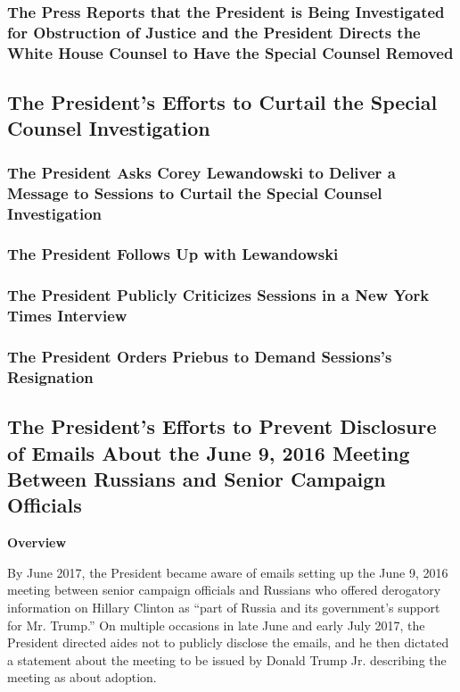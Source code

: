 \subsubsection{The Press Reports that the President is Being Investigated for Obstruction of Justice and the President Directs the White House Counsel to Have the Special Counsel Removed}

\subsection{The President’s Efforts to Curtail the Special Counsel Investigation}

\subsubsection{The President Asks Corey Lewandowski to Deliver a Message to Sessions to Curtail the Special Counsel Investigation}

\subsubsection{The President Follows Up with Lewandowski}

\subsubsection{The President Publicly Criticizes Sessions in a New York Times Interview}

\subsubsection{The President Orders Priebus to Demand Sessions’s Resignation}

\subsection{The President’s Efforts to Prevent Disclosure of Emails About the June 9, 2016 Meeting Between Russians and Senior Campaign Officials}

\begin{center}
\textbf{Overview}
\end{center}

By June 2017, the President became aware of emails setting up the June 9, 2016 meeting between senior campaign officials and Russians who offered derogatory information on Hillary Clinton as “part of Russia and its government’s support for Mr. Trump.”
On multiple occasions in late June and early July 2017, the President directed aides not to publicly disclose the emails, and he then dictated a statement about the meeting to be issued by Donald Trump Jr. describing the meeting as about adoption.

